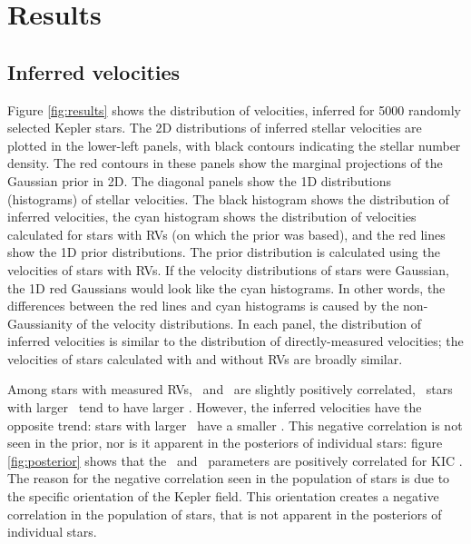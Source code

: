\section{Results}
\label{sec:results}

\subsection{Inferred velocities}

Figure \ref{fig:results} shows the distribution of velocities, inferred for
5000 randomly selected Kepler stars.
The 2D distributions of inferred stellar velocities are plotted in the
lower-left panels, with black contours indicating the stellar number density.
The red contours in these panels show the marginal projections of the
Gaussian prior in 2D.
The diagonal panels show the 1D distributions (histograms) of stellar
velocities.
The black histogram shows the distribution of inferred velocities, the cyan
histogram shows the distribution of velocities calculated for stars with RVs
(on which the prior was based), and the red lines show the 1D prior
distributions.
The prior distribution is calculated using the velocities of stars with RVs.
If the velocity distributions of stars were Gaussian, the 1D red Gaussians
would look like the cyan histograms.
In other words, the differences between the red lines and cyan histograms
is caused by the non-Gaussianity of the velocity distributions.
In each panel, the distribution of inferred velocities is similar to the
distribution of directly-measured velocities; the velocities of stars
calculated with and without RVs are broadly similar.

Among stars with measured RVs, \vy\ and \vz\ are slightly positively
correlated, \ie\ stars with larger \vy\ tend to have larger \vz.
However, the inferred velocities have the opposite trend: stars with larger
\vy\ have a smaller \vz.
This negative correlation is not seen in the prior, nor is it apparent in the
posteriors of individual stars: figure \ref{fig:posterior} shows that the \vy\
and \vz\ parameters are positively correlated for KIC \kicstar.
The reason for the negative correlation seen in the population of stars is due
to the specific orientation of the Kepler field.
This orientation creates a negative correlation in the population of stars,
that is not apparent in the posteriors of individual stars.


